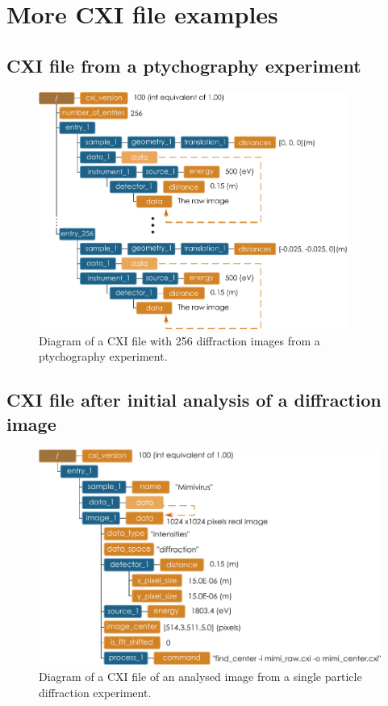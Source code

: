 \documentclass[usletter,11pt]{article}
\begin{document}
\clearpage
\appendix
\section{More CXI file examples}

\subsection{CXI file from a ptychography experiment}

\begin{figure}[h!]
\centering
\includegraphics[width=0.9\textwidth]{ptychography_cxi.pdf}
\caption{Diagram of a CXI file with 256 diffraction images from a ptychography experiment.}
\label{fig:ptychography_cxi}
\end{figure}


\clearpage
\subsection{CXI file after initial analysis of a diffraction image}

\begin{figure}[h!]
\centering
\includegraphics[width=\textwidth]{analysed_image.pdf}
\caption{Diagram of a CXI file of an analysed image from a single
particle diffraction experiment.}
\label{fig:analysed_image}
\end{figure}
\end{document}
